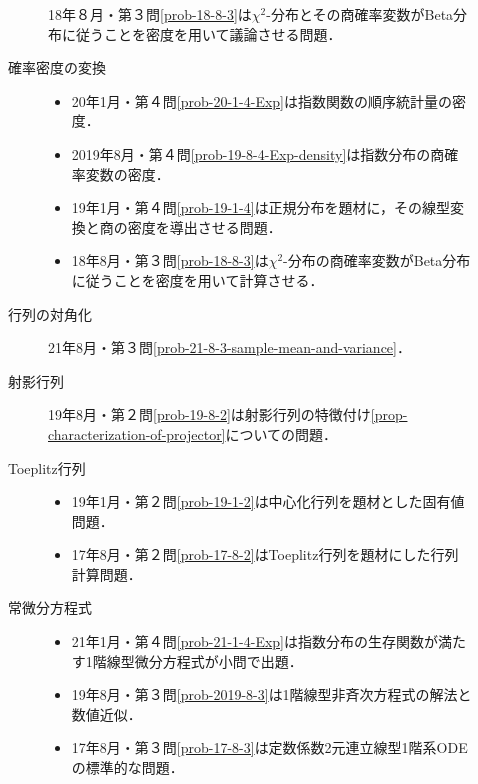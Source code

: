 \documentclass[uplatex,dvipdfmx]{jsarticle}
\begin{document}
\begin{description}
\begin{description}
        18年８月・第３問\ref{prob-18-8-3}は$\chi^2$-分布とその商確率変数がBeta分布に従うことを密度を用いて議論させる問題．
        \item[確率密度の変換] \mbox{}
        \begin{itemize}
            \item 20年1月・第４問\ref{prob-20-1-4-Exp}は指数関数の順序統計量の密度．
            \item 2019年8月・第４問\ref{prob-19-8-4-Exp-density}は指数分布の商確率変数の密度．
            \item 19年1月・第４問\ref{prob-19-1-4}は正規分布を題材に，その線型変換と商の密度を導出させる問題．
            \item 18年8月・第３問\ref{prob-18-8-3}は$\chi^2$-分布の商確率変数がBeta分布に従うことを密度を用いて計算させる．
        \end{itemize}

        \item[行列の対角化] 21年8月・第３問\ref{prob-21-8-3-sample-mean-and-variance}．
        \item[射影行列] 19年8月・第２問\ref{prob-19-8-2}は射影行列の特徴付け\ref{prop-characterization-of-projector}についての問題．
        \item[Toeplitz行列] \mbox{}
        \begin{itemize}
            \item 19年1月・第２問\ref{prob-19-1-2}は中心化行列を題材とした固有値問題．
            \item 17年8月・第２問\ref{prob-17-8-2}はToeplitz行列を題材にした行列計算問題．
        \end{itemize}

        \item[常微分方程式] \mbox{}
        \begin{itemize}
            \item 21年1月・第４問\ref{prob-21-1-4-Exp}は指数分布の生存関数が満たす1階線型微分方程式が小問で出題．
            \item 19年8月・第３問\ref{prob-2019-8-3}は1階線型非斉次方程式の解法と数値近似．
            \item 17年8月・第３問\ref{prob-17-8-3}は定数係数2元連立線型1階系ODEの標準的な問題．
        \end{itemize}
        

\end{description}
\end{description}
\end{document}
